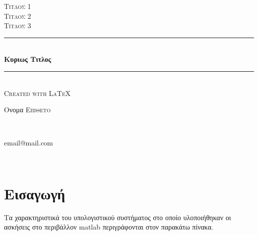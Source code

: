 \documentclass[a4paper,11pt]{article}
\begin{document}
\begin{titlepage}
	\newcommand{\HRule}{\rule{\linewidth}{0.5mm}} %
	\center
	
	\textsc{\LARGE Τιτλος 1}\\[1.5cm] %
	\textsc{\Large Τιτλος 2}\\[0.5cm] %
	\textsc{\large Τιτλος 3}\\[10ex] %

	\HRule \\[0.4cm]
	{ \huge \bfseries Κυριως Τιτλος}\\[0.4cm] %
	\HRule \\[1.5cm]
 	
	\textsc{Created with \LaTeX}
	
	\vfill 
	\begin{minipage}{0.4\textwidth}
	\begin{flushleft} \large
	Ονομα \textsc{Επιθετο} 
	\end{flushleft}
	\end{minipage}
	~
	\begin{minipage}{0.4\textwidth}
	\begin{flushright} \large
	email@mail.com
	\end{flushright}
	\end{minipage}\\[4cm]
	\pagebreak
	
\end{titlepage}

\clearpage{\thispagestyle{empty}}\mbox{}\clearpage 
\tableofcontents{ \thispagestyle{empty}}
\newpage


\renewcommand\thesection{}
\section{Εισαγωγή}
	Τα χαρακτηριστικά του υπολογιστικού συστήματος στο οποίο υλοποιήθηκαν οι ασκήσεις στο περιβάλλον matlab περιγράφονται στον παρακάτω πίνακα. \\
\end{document}

